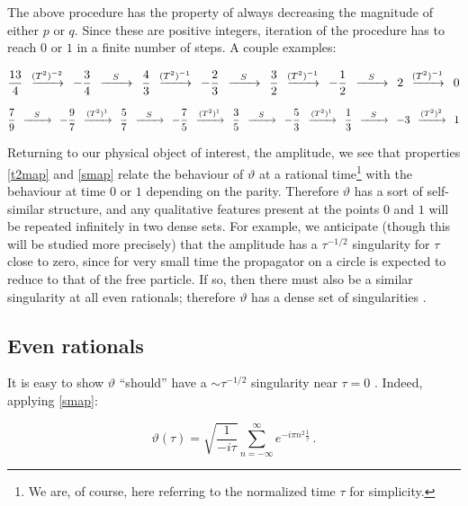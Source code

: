 \documentclass{article}
\newcommand{\T}{\ensuremath{\vartheta}}
\newcommand{\sumZ}{\sum_{n=-\infty}^{\infty}}
\begin{document}
The above procedure has the property of always decreasing the magnitude of either $p$ or $q$. Since these are positive integers, iteration of the procedure has to reach $0$ or $1$ in a finite number of steps. A couple examples:

\newcommand{\sapp}{\,\;\ensuremath{\xrightarrow{\mathmakebox[2em]{S}}}\;\,}
\newcommand{\tapp}[1]{\,\;\xrightarrow{\mathmakebox[2em]{(T^2)^{#1}}}\;\,}

\begin{equation*}
    \frac{13}{4} \tapp{-2} - \frac{3}{4} \sapp \frac{4}{3} \tapp{-1} - \frac{2}{3} \sapp \frac{3}{2} \tapp{-1} -\frac{1}{2} \sapp 2 \tapp{-1} 0
\end{equation*}

\begin{equation*}
    \frac{7}{9} \sapp - \frac{9}{7} \tapp{1} \frac{5}{7} \sapp -\frac{7}{5} \tapp{1} \frac{3}{5} \sapp - \frac{5}{3} \tapp{1} \frac{1}{3} \sapp -3 \tapp{2} 1
\end{equation*}

Returning to our physical object of interest, the amplitude, we see that properties \eqref{t2map} and \eqref{smap} relate the behaviour of $\T$ at a rational time\footnote{We are, of course, here referring to the normalized time $\tau$ for simplicity.} with the behaviour at time $0$ or $1$ depending on the parity. Therefore $\T$ has a sort of self-similar structure, and any qualitative features present at the points $0$ and $1$ will be repeated infinitely in two dense sets. For example, we anticipate (though this will be studied more precisely) that the amplitude has a $\tau^{-1/2}$ singularity for $\tau$ close to zero, since for very small time the propagator on a circle is expected to reduce to that of the free particle. If so, then there must also be a similar singularity at all even rationals; therefore $\T$ has a dense set of singularities \cite{intermode_traces}.


\subsection{Even rationals}\label{sec:evens}

\newcommand{\asympt}{(-i\tau)^{-1/2}}

It is easy to show $\T$ ``should'' have a $\sim \tau^{-1/2}$ singularity near $\tau = 0$ \cite{boxpdf}. Indeed, applying  \eqref{smap}:

\begin{equation*}
    \vartheta(\tau) = \sqrt{\frac{1}{-i\tau}} \sumZ e^{-i\pi n^2 \frac{1}{\tau}}\,.
\end{equation*}
\end{document}
